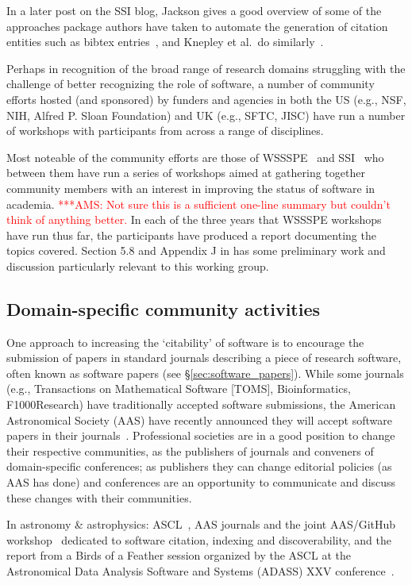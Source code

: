 \documentclass[11pt, oneside]{amsart}
\newcommand{\asnote}[1]{ {\textcolor{red} { ***AMS: #1 }}} %
\begin{document}
In a later post on the SSI blog, Jackson gives a good overview of some of the approaches
package authors have taken to automate the generation of citation entities such as bibtex entries~\cite{ssi-how-shalt-i-cite-thee},
and Knepley et al.\ do similarly~\cite{knepley2013accurately}.

Perhaps in recognition of the broad range of research domains struggling with
the challenge of better recognizing the role of software, a number of community
efforts hosted (and sponsored) by funders and agencies in both the US (e.g., NSF,
NIH, Alfred P. Sloan Foundation) and UK (e.g., SFTC, JISC) have run a number of
workshops with participants from across a range of disciplines.

Most noteable of the community efforts are those of WSSSPE~\cite{wssspe} and
SSI~\cite{ssi-workshops} who between them have run a series of workshops aimed
at gathering together community members with an interest in improving the
status of software in academia. \asnote{Not sure this is a sufficient one-line
summary but couldn't think of anything better.} In each of the three years that
WSSSPE workshops have run thus far, the participants have produced a report
documenting the topics covered. Section 5.8 and Appendix J in \cite{WSSSPE3}
has some preliminary work and discussion particularly relevant to this working
group.

\subsection{Domain-specific community activities}

One approach to increasing the `citability' of software is to encourage the
submission of papers in standard journals describing a piece of research
software, often known as software papers (see \S\ref{sec:software_papers}).
While some journals (e.g., Transactions on Mathematical Software [TOMS], Bioinformatics, F1000Research) have traditionally accepted
software submissions, the American Astronomical Society (AAS) have recently
announced they will accept software papers in their journals~\cite{aas-sofware-papers}. 
Professional societies are in a good position to change their respective communities, as the publishers of journals and conveners of domain-specific conferences; as publishers they can change editorial policies (as AAS has done) and conferences are an opportunity to communicate and discuss these changes with their communities.

In astronomy \& astrophysics: ASCL~\cite{ascl}, AAS journals  and the joint
AAS/GitHub workshop~\cite{aas-software-index} dedicated to software citation,
indexing and discoverability, and the report from a Birds of a Feather session
organized by the ASCL at the Astronomical Data Analysis Software and Systems
(ADASS) XXV conference~\cite{2015arXiv151207919A}.
\end{document}
